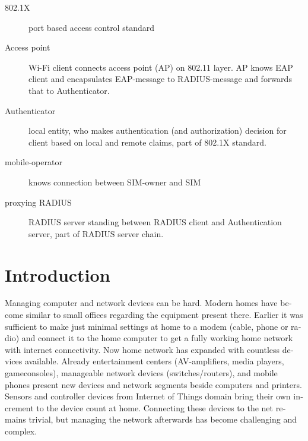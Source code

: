 \documentclass[12pt,a4paper,english]{tutthesis}
\begin{document}
\begin{otherlanguage}{english}

\begin{description}
\item[{802.1X}] port based access control standard
\item[{Access point}] Wi-Fi client connects access point (AP) on 802.11
layer. AP knows EAP client and encapsulates EAP-message
to RADIUS-message and forwards that to
Authenticator.
\end{description}
\begin{description}
\item[{Authenticator}] local entity, who makes authentication (and
authorization) decision for client based on local and remote
claims, part of 802.1X standard.
\end{description}
\begin{description}
\item[{mobile-operator}] knows connection between SIM-owner and SIM
\end{description}
\begin{description}
\item[{proxying RADIUS}] RADIUS server standing between RADIUS
client and Authentication server, part of RADIUS server chain.
\end{description}



\if@twoside
\cleardoublepage
\fi

\newpage             %
\setcounter{page}{1} %
\renewcommand{\chaptername}{} %

\chapter{Introduction}
\label{sec-1}
\label{cha:intro}


Managing computer and network devices can be hard.  Modern homes have
become similar to small offices regarding the equipment present there.
Earlier it was sufficient to make just minimal settings at home to a
modem (cable, phone or radio) and connect it to the home computer to
get a fully working home network with internet connectivity.  Now home
network has expanded with countless devices available.  Already
entertainment centers (AV-amplifiers, media players, gameconsoles),
manageable network devices (switches/routers), and mobile phones
present new devices and network segments beside computers and
printers. Sensors and controller devices from Internet of Things
domain bring their own increment to the device count at home.
Connecting these devices to the net remains trivial, but managing the
network afterwards has become challenging and complex.


\end{otherlanguage}
\end{document}
